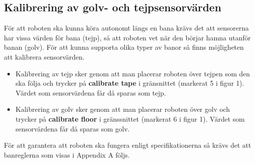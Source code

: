 \subsection{Kalibrering av golv- och tejpsensorvärden}
	För att roboten ska kunna köra autonomt längs en bana krävs det att sensorerna har vissa värden för bana (tejp), så att roboten vet när den börjar hamna utanför banan (golv). För att kunna supporta olika typer av banor så finns möjligheten att kalibrera sensorvärden.
\begin{itemize}
	\item Kalibrering av tejp sker genom att man placerar roboten över tejpen som den ska följa och trycker på \textbf{calibrate tape} i gränsnittet (markerat 5 i figur 1). Värdet som sensorvärdena får då sparas som tejp.
	\item Kalibrering av golv sker genom att man placerar roboten över golv och trycker på \textbf{calibrate floor} i gränssnittet (markerat 6 i figur 1). Värdet som sensorvärdena får då sparas som golv.
\end{itemize}
För att garantera att roboten ska fungera enligt specifikationerna så krävs det att banreglerna som visas i Appendix A följs.